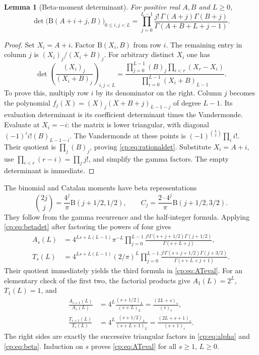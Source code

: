 \documentclass[11pt]{article}
\newtheorem{lemma}[theorem]{Lemma}
\theoremstyle{definition}
\theoremstyle{remark}
\newcommand{\rise}[2]{(#1)_{#2}}
\theoremstyle{definition}
\theoremstyle{plain}
\numberwithin{equation}{section}
\begin{document}
\begin{lemma}[Beta-moment determinant]
\label{cp:lem:betadet}
For positive real $A,B$ and $L\ge0$,
\begin{equation}
 \det\bigl(\mathrm B(A+i+j,B)\bigr)_{0\le i,j<L}
 =\prod_{j=0}^{L-1}
   \frac{j!\,\Gamma(A+j)\Gamma(B+j)}{\Gamma(A+B+L+j-1)}.
 \label{cp:eq:betadet}
\end{equation}
\end{lemma}
\begin{proof}
Set $X_i=A+i$. Factor $\mathrm B(X_i,B)$ from row $i$.
The remaining entry in column $j$ is
$\rise{X_i}j/\rise{X_i+B}j$.
For arbitrary distinct $X_i$ one has
\begin{equation}
 \det\left(\frac{\rise{X_i}j}{\rise{X_i+B}j}\right)_{i,j<L}
 =\frac{\displaystyle\prod_{j=0}^{L-1}\rise Bj
              \prod_{i<r}(X_r-X_i)}
        {\displaystyle\prod_{i=0}^{L-1}\rise{X_i+B}{L-1}}.
 \label{cp:eq:rationaldet}
\end{equation}
To prove this, multiply row $i$ by its denominator on the right.
Column $j$ becomes the polynomial
$f_j(X)=\rise Xj\rise{X+B+j}{L-1-j}$ of degree $L-1$.
Its evaluation determinant is its coefficient determinant times the
Vandermonde. Evaluate at $X_i=-i$: the matrix is lower triangular,
with diagonal $(-1)^i i!\rise B{L-1-i}$.
The Vandermonde at these points is
$(-1)^{\binom L2}\prod_i i!$. Their quotient is
$\prod_j\rise Bj$, proving \eqref{cp:eq:rationaldet}.
Substitute $X_i=A+i$, use
$\prod_{i<r}(r-i)=\prod_j j!$, and simplify the gamma factors.
The empty determinant is immediate.
\end{proof}

The binomial and Catalan moments have beta representations
\begin{equation}
 \binom{2j}{j}=\frac{4^j}{\pi}\mathrm B(j+1/2,1/2),\qquad
 C_j=\frac{2\cdot4^j}{\pi}\mathrm B(j+1/2,3/2).
 \label{cp:eq:betamoments}
\end{equation}
They follow from the gamma recurrence and the half-integer formula.
Applying \eqref{cp:eq:betadet} after factoring the powers of four gives
\begin{align}
 A_s(L)&=4^{Ls+L(L-1)}\pi^{-L}
  \prod_{j=0}^{L-1}
   \frac{j!\Gamma(s+j+1/2)\Gamma(j+1/2)}{\Gamma(s+L+j)},
 \label{cp:eq:Aproduct}\\
 T_s(L)&=4^{Ls+L(L-1)}(2/\pi)^L
  \prod_{j=0}^{L-1}
   \frac{j!\Gamma(s+j+1/2)\Gamma(j+3/2)}{\Gamma(s+L+j+1)}.
 \label{cp:eq:Tproduct}
\end{align}
Their quotient immediately yields the third formula in
\eqref{cp:eq:ATeval}.
For an elementary check of the first two, the factorial products give
$A_1(L)=2^L$, $T_1(L)=1$, and
\begin{align*}
 \frac{A_{s+1}(L)}{A_s(L)}
 &=4^L\frac{\rise{s+1/2}L}{\rise{s+L}L}
   =\frac{\rise{2L+s}s}{\rise ss},\\
 \frac{T_{s+1}(L)}{T_s(L)}
 &=4^L\frac{\rise{s+1/2}L}{\rise{s+L+1}L}
   =\frac{\rise{2L+s+1}s}{\rise{s+1}s}.
\end{align*}
The right sides are exactly the successive triangular factors in
\eqref{cp:eq:alpha} and \eqref{cp:eq:beta}. Induction on $s$ proves
\eqref{cp:eq:ATeval} for all $s\ge1$, $L\ge0$.
\end{document}
